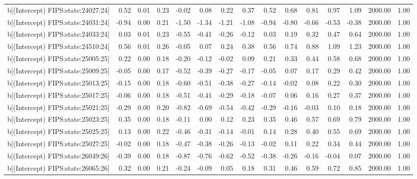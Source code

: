 \begin{table}[ht]
\begin{tabular}{rrrrrrrrrrrrrrr}
  b[(Intercept) FIPS:state:24027:24] & 0.52 & 0.01 & 0.23 & -0.02 & 0.08 & 0.22 & 0.37 & 0.52 & 0.68 & 0.81 & 0.97 & 1.09 & 2000.00 & 1.00 \\ 
  b[(Intercept) FIPS:state:24031:24] & -0.94 & 0.00 & 0.21 & -1.50 & -1.34 & -1.21 & -1.08 & -0.94 & -0.80 & -0.66 & -0.53 & -0.38 & 2000.00 & 1.00 \\ 
  b[(Intercept) FIPS:state:24033:24] & 0.03 & 0.01 & 0.23 & -0.55 & -0.41 & -0.26 & -0.12 & 0.03 & 0.19 & 0.32 & 0.47 & 0.64 & 2000.00 & 1.00 \\ 
  b[(Intercept) FIPS:state:24510:24] & 0.56 & 0.01 & 0.26 & -0.05 & 0.07 & 0.24 & 0.38 & 0.56 & 0.74 & 0.88 & 1.09 & 1.23 & 2000.00 & 1.00 \\ 
  b[(Intercept) FIPS:state:25005:25] & 0.22 & 0.00 & 0.18 & -0.20 & -0.12 & -0.02 & 0.09 & 0.21 & 0.33 & 0.44 & 0.58 & 0.68 & 2000.00 & 1.00 \\ 
  b[(Intercept) FIPS:state:25009:25] & -0.05 & 0.00 & 0.17 & -0.52 & -0.39 & -0.27 & -0.17 & -0.05 & 0.07 & 0.17 & 0.29 & 0.42 & 2000.00 & 1.00 \\ 
  b[(Intercept) FIPS:state:25013:25] & -0.15 & 0.00 & 0.18 & -0.60 & -0.51 & -0.38 & -0.27 & -0.14 & -0.02 & 0.08 & 0.22 & 0.30 & 2000.00 & 1.00 \\ 
  b[(Intercept) FIPS:state:25017:25] & -0.06 & 0.00 & 0.18 & -0.51 & -0.41 & -0.29 & -0.18 & -0.07 & 0.06 & 0.16 & 0.27 & 0.37 & 2000.00 & 1.00 \\ 
  b[(Intercept) FIPS:state:25021:25] & -0.29 & 0.00 & 0.20 & -0.82 & -0.69 & -0.54 & -0.42 & -0.29 & -0.16 & -0.03 & 0.10 & 0.18 & 2000.00 & 1.00 \\ 
  b[(Intercept) FIPS:state:25023:25] & 0.35 & 0.00 & 0.18 & -0.11 & 0.00 & 0.12 & 0.23 & 0.35 & 0.46 & 0.57 & 0.69 & 0.79 & 2000.00 & 1.00 \\ 
  b[(Intercept) FIPS:state:25025:25] & 0.13 & 0.00 & 0.22 & -0.46 & -0.31 & -0.14 & -0.01 & 0.14 & 0.28 & 0.40 & 0.55 & 0.69 & 2000.00 & 1.00 \\ 
  b[(Intercept) FIPS:state:25027:25] & -0.02 & 0.00 & 0.18 & -0.47 & -0.38 & -0.26 & -0.13 & -0.02 & 0.11 & 0.22 & 0.34 & 0.44 & 2000.00 & 1.00 \\ 
  b[(Intercept) FIPS:state:26049:26] & -0.39 & 0.00 & 0.18 & -0.87 & -0.76 & -0.62 & -0.52 & -0.38 & -0.26 & -0.16 & -0.04 & 0.07 & 2000.00 & 1.00 \\ 
  b[(Intercept) FIPS:state:26065:26] & 0.32 & 0.00 & 0.21 & -0.24 & -0.09 & 0.05 & 0.18 & 0.31 & 0.46 & 0.59 & 0.72 & 0.85 & 2000.00 & 1.00 \\ 

\end{tabular}
\end{table}
